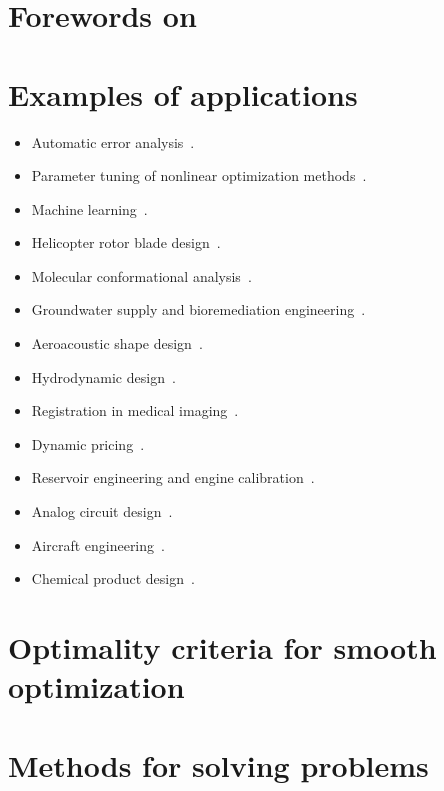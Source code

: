 \section{Forewords on }

\section{Examples of  applications}

\begin{itemize}
    \item Automatic error analysis~\cite{Higham_1993,Higham_2002}.
    \item Parameter tuning of nonlinear optimization methods~\cite{Audet_Orban_2006}.
    \item Machine learning~\cite{Ghanbari_Scheinberg_2017,Qian_Yu_2021}.
    \item Helicopter rotor blade design~\cite{Booker_Etal_1998a,Booker_Etal_1998b,Serafini_1998}.
    \item Molecular conformational analysis~\cite{Alberto_Etal_2004,Meza_Martinez_1994}.
    \item Groundwater supply and bioremediation engineering~\cite{Fowler_Etal_2008,Mugunthan_Shoemaker_Regis_2005,Yoon_Shoemaker_1999}.
    \item Aeroacoustic shape design~\cite{Marsden_2004,Marsden_Etal_2004}.
    \item Hydrodynamic design~\cite{Duvigneau_Visonneau_2004}.
    \item Registration in medical imaging~\cite{Oeuvray_2005,Oeuvray_Bierlaire_2007}.
    \item Dynamic pricing~\cite{Levina_Etal_2009}.
    \item Reservoir engineering and engine calibration~\cite{Langouet_2011}.
    \item Analog circuit design~\cite{Latorre_Etal_2019}.
    \item Aircraft engineering~\cite{Gazaix_Etal_2019}.
    \item Chemical product design~\cite{Sun_Etal_2020}.
\end{itemize}

\section{Optimality criteria for smooth optimization}

\section{Methods for solving  problems}
